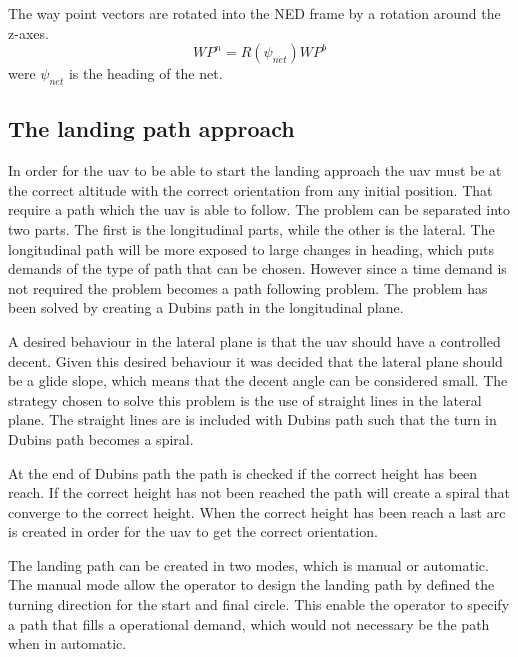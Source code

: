The way point vectors are rotated into the NED frame by a rotation around the z-axes.
\begin{equation}
WP^n = R(\psi_{net})WP^b
\end{equation}
were $\psi_{net}$ is the heading of the net.
\begin{figure}
\def\svgwidth{\textwidth} %

\end{figure}

\subsection{The landing path approach}
In order for the \gls{uav} to be able to start the landing approach the \gls{uav} must be at the correct altitude with the correct orientation from any initial position. That require a path which the \gls{uav} is able to follow. The problem can be separated into two parts. The first is the longitudinal parts, while the other is the lateral. The longitudinal path will be more exposed to large changes in heading, which puts demands of the type of path that can be chosen. However since a time demand is not required the problem becomes a path following problem. The problem has been solved by creating a Dubins path in the longitudinal plane.

A desired behaviour in the lateral plane is that the \gls{uav} should have a controlled decent. Given this desired behaviour it was decided that the lateral plane should be a glide slope, which means that the decent angle can be considered small. The strategy chosen to solve this problem is the use of straight lines in the lateral plane. The straight lines are is included with Dubins path such that the turn in Dubins path becomes a spiral.

At the end of Dubins path the path is checked if the correct height has been reach. If the correct height has not been reached the path will create a spiral that converge to the correct height. When the correct height has been reach a last arc is created in order for the \gls{uav} to get the correct orientation.

The landing path can be created in two modes, which is manual or automatic. The manual mode allow the operator to design the landing path by defined the turning direction for the start and final circle. This enable the operator to specify a path that fills a operational demand, which would not necessary be the path when in automatic.

